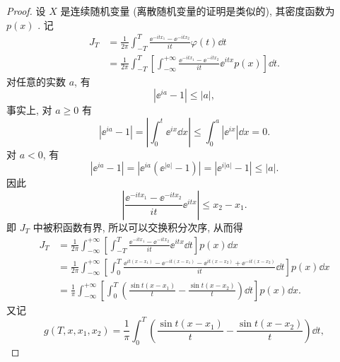 \begin{proof}
    设 $ X $ 是连续随机变量 (离散随机变量的证明是类似的), 其密度函数为 $ p (x) $ .
    记
    \begin{align*}
        J_T & = \frac{1}{2\pi} \int_{-T}^T \frac{\ee^{-itx_1}  - \ee^{-itx_2}}{it} \varphi (t) \dd t\\
        & = \frac{1}{2\pi} \int_{-T}^T \left[ \int_{-\infty}^{+\infty} \frac{\ee^{-itx_1}  - \ee^{-itx_2}}{it} \ee^{itx} p (x) \right] \dd t.
    \end{align*}
    对任意的实数 $ a $, 有
    \begin{equation*}
        \left\lvert \ee^{ia} -1 \right\rvert \leq \lvert a \rvert,
    \end{equation*}
    事实上, 对 $ a \geq 0 $ 有
    \begin{equation*}
        \left\lvert \ee^{ia} - 1 \right\rvert = \left\lvert \int_0^t \ee^{ix} \dd x \right\rvert \leq \int_0^a \left\lvert \ee^{ix} \right\rvert \dd x = 0.
    \end{equation*}
    对 $ a < 0 $, 有
    \begin{equation*}
        \left\lvert \ee^{ia} - 1 \right\rvert = \left\lvert \ee^{ia} \left( \ee^{\lvert a \rvert} - 1 \right) \right\rvert = \left\lvert \ee^{i \lvert a \rvert} - 1 \right\rvert \leq \lvert a \rvert.
    \end{equation*}
    因此
    \begin{equation*}
        \left\lvert \frac{\ee^{-itx_1} - \ee^{-itx_2}}{it} \ee^{itx} \right\rvert \leq x_2 - x_1.
    \end{equation*}
    即 $ J_T $ 中被积函数有界, 所以可以交换积分次序, 从而得
    \begin{align*}
        J_T & = \frac{1}{2\pi} \int_{-\infty}^{+\infty} \left[ \int_{-T}^{T} \frac{\ee^{-itx_1} - \ee^{-itx_2}}{it} \ee^{itx} \dd t \right] p (x) \dd x\\
        & = \frac{1}{2\pi} \int_{-\infty}^{+\infty} \left[ \int_{0}^{T} \frac{\ee^{it(x - x_1)} - \ee^{-it (x - x_1)} - \ee^{it (x - x_2)} + \ee^{-it (x - x_2)}}{it} \dd t \right] p (x) \dd x\\
        & = \frac{1}{\pi} \int_{-\infty}^{+\infty} \left[ \int_{0}^{T} \left(\frac{\sin t (x - x_1)}{t} - \frac{\sin t (x - x_2)}{t} \right) \dd t \right] p (x) \dd x.
    \end{align*}
    又记
    \begin{equation*}
        g (T, x, x_1, x_2) = \frac{1}{\pi} \int_{0}^{T} \left(\frac{\sin t (x - x_1)}{t} - \frac{\sin t (x - x_2)}{t} \right) \dd t,

\end{equation*}
\end{proof}
